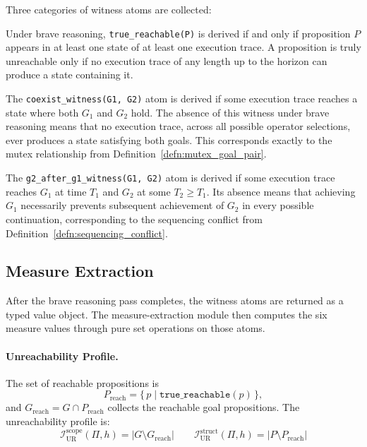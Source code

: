 Three categories of witness atoms are collected:



Under brave reasoning, \texttt{true\_reachable(P)} is derived if and only if proposition $P$ appears in at least one state of at least one execution trace. A proposition is truly unreachable only if no execution trace of any length up to the horizon can produce a state containing it.

The \texttt{coexist\_witness(G1, G2)} atom is derived if some execution trace rea\-ches a state where both $G_1$ and $G_2$ hold. The absence of this witness under brave reasoning means that no execution trace, across all possible operator selections, ever produces a state satisfying both goals. This corresponds exactly to the mutex relationship from Definition~\ref{defn:mutex_goal_pair}.

The \texttt{g2\_after\_g1\_witness(G1, G2)} atom is derived if some execution trace reaches $G_1$ at time $T_1$ and $G_2$ at some $T_2 \geq T_1$. Its absence means that achieving $G_1$ necessarily prevents subsequent achievement of $G_2$ in every possible continuation, corresponding to the sequencing conflict from Definition~\ref{defn:sequencing_conflict}.

\subsection{Measure Extraction}
\label{sec:measure_extraction}

After the brave reasoning pass completes, the witness atoms are returned as a typed value object. The measure-extraction module then computes the six measure values through pure set operations on those atoms.

\paragraph{Unreachability Profile.}
The set of reachable propositions is
\begin{equation*}
    P_{\text{reach}} = \{\, p \mid \texttt{true\_reachable}(p) \,\},
\end{equation*}
and $G_{\text{reach}} = G \cap P_{\text{reach}}$ collects the reachable goal propositions. The unreachability profile is:
\begin{equation*}
    \mathcal{I}^{\text{scope}}_{\text{UR}}(\Pi, h) = |G \setminus G_{\text{reach}}| \qquad \mathcal{I}^{\text{struct}}_{\text{UR}}(\Pi, h) = |P \setminus P_{\text{reach}}|
\end{equation*}


